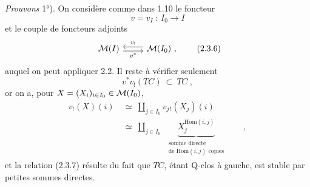 \textit{Prouvons} 1°). On considère comme dans 1.10 le foncteur
\[
v = v_I\ :\ I_0 \longrightarrow I
\]
et le couple de foncteurs adjoints
\[
\begin{tikzcd}
\M(I) \arrow[r, shift right, "v^*"'] & \M(I_0)\ , \arrow[l, shift right, "v_!"']
\end{tikzcd}
\tag*{(2.3.6)}
\]
auquel on peut appliquer 2.2. Il reste
à vérifier seulement
\[
v^*v_!(TC)\ \subset\ TC\ ,
\tag*{(2.3.7)}
\]
or on a, pour $X = (X_i)_{i \in I_0} \in \mathcal{M}(I_0)$,
\[
\begin{aligned}
v_!(X)(i) &\ \simeq\ \textstyle\coprod_{j \in I_0} v_{j\,!}(X_j)(i)\\
&\ \simeq\ \textstyle\coprod_{j \in I_0}\ \ \underbrace{X_j^{\mathrm{Hom}(i,j)}}_{\substack{\text{somme directe}\\ \text{de }\mathrm{Hom}(i,j)\text{ copies}}}\qquad ,
\end{aligned}
\]
et la relation (2.3.7) résulte du fait que $TC$, étant Q-clos à gauche, est stable par petites sommes directes.

